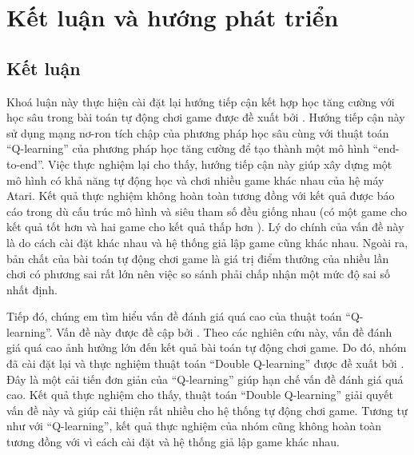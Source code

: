 \chapter{Kết luận và hướng phát triển}
\section{Kết luận}
	Khoá luận này thực hiện cài đặt lại hướng tiếp cận kết hợp học tăng cường với học sâu trong bài toán tự động chơi game được đề xuất bởi \cite{mnihdqn2015}.
	Hướng tiếp cận này sử dụng mạng nơ-ron tích chập của phương pháp học sâu cùng với thuật toán ``Q-learning'' của phương pháp học tăng cường để tạo thành một mô hình ``end-to-end''.
	Việc thực nghiệm lại cho thấy, hướng tiếp cận này giúp xây dựng một mô hình có khả năng tự động học và chơi nhiều game khác nhau của hệ máy Atari.
	Kết quả thực nghiệm không hoàn toàn tương đồng với kết quả được báo cáo trong \cite{mnihdqn2015} dù cấu trúc mô hình và siêu tham số đều giống nhau (có một game cho kết quả tốt hơn \cite{mnihdqn2015} và hai game cho kết quả thấp hơn \cite{mnihdqn2015}).
	Lý do chính của vấn đề này là do cách cài đặt khác nhau và hệ thống giả lập game cũng khác nhau.
	Ngoài ra, bản chất của bài toán tự động chơi game là giá trị điểm thưởng của nhiều lần chơi có phương sai rất lớn nên việc so sánh phải chấp nhận một mức độ sai số nhất định.
	
	Tiếp đó, chúng em tìm hiểu vấn đề đánh giá quá cao của thuật toán ``Q-learning''.
	Vấn đề này được đề cập bởi \cite{hasselt2010double, van2015deep}.
	Theo các nghiên cứu này, vấn đề đánh giá quá cao ảnh hưởng lớn đến kết quả bài toán tự động chơi game.
	Do đó, nhóm đã cài đặt lại và thực nghiệm thuật toán ``Double Q-learning'' được đề xuất bởi \cite{van2015deep}.
	Đây là một cải tiến đơn giản của ``Q-learning'' giúp hạn chế vấn đề đánh giá quá cao.
	Kết quả thực nghiệm cho thấy, thuật toán ``Double Q-learning'' giải quyết vấn đề này và giúp cải thiện 	rất nhiều cho hệ thống tự động chơi game.
	Tương tự như với ``Q-learning'', kết quả thực nghiệm của nhóm cũng không hoàn toàn tương đồng với \cite{van2015deep} vì cách cài đặt và hệ thống giả lập game khác nhau.

